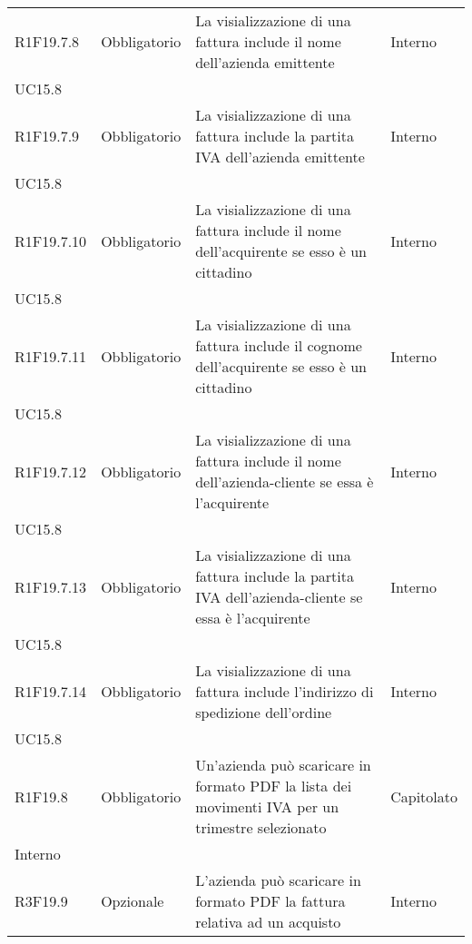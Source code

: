 \begin{longtable}{ >{\centering}p{} >{\centering}p{}
			>{\raggedright}p{} >{\centering}p{}}
R1F19.7.8	&	Obbligatorio	&	La visializzazione di una fattura include il nome dell'azienda emittente	&	Interno\\ UC15.8	\tabularnewline
R1F19.7.9	&	Obbligatorio	&	La visializzazione di una fattura include la partita IVA dell'azienda emittente	&	Interno\\ UC15.8	\tabularnewline
R1F19.7.10	&	Obbligatorio	&	La visializzazione di una fattura include il nome dell'acquirente se esso è un cittadino	&	Interno\\ UC15.8	\tabularnewline
R1F19.7.11	&	Obbligatorio	&	La visializzazione di una fattura include il cognome dell'acquirente se esso è un cittadino	&	Interno\\ UC15.8	\tabularnewline
R1F19.7.12	&	Obbligatorio	&	La visializzazione di una fattura include il nome dell'azienda-cliente se essa è l'acquirente	&	Interno\\ UC15.8	\tabularnewline
R1F19.7.13	&	Obbligatorio	&	La visializzazione di una fattura include la partita IVA dell'azienda-cliente se essa è l'acquirente	&	Interno\\ UC15.8	\tabularnewline
R1F19.7.14	&	Obbligatorio	&	La visializzazione di una fattura include l'indirizzo di spedizione dell'ordine	&	Interno\\ UC15.8	\tabularnewline
R1F19.8	&	Obbligatorio	&	Un'azienda può scaricare in formato PDF la lista dei movimenti IVA per un trimestre selezionato	&	Capitolato\\ Interno	\tabularnewline
R3F19.9	&	Opzionale	&	L'azienda può scaricare in formato PDF la fattura relativa ad un acquisto	&	Interno	\tabularnewline
		
		
		
	\end{longtable}

